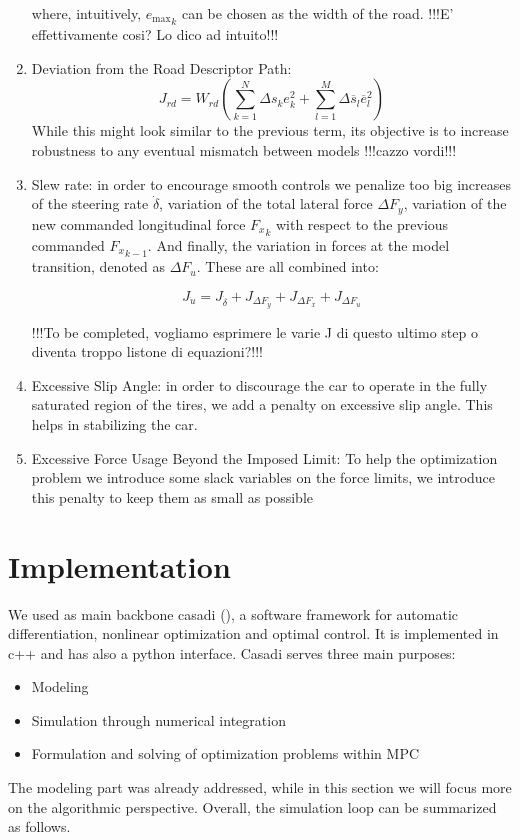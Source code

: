 \documentclass[a4paper, onecolumn, 12pt]{article}
\begin{document}
\begin{enumerate}
    where, intuitively, ${e_{\text{max}}}_k$ can be chosen as the width of the road. !!!E' effettivamente cosi? Lo dico ad intuito!!!

    \item Deviation from the Road Descriptor Path: 
    \begin{equation}
    J_{rd} = W_{rd}(\sum_{k=1}^{N} \Delta s_k e_k^2 + \sum_{l=1}^{M} \Delta\overline{s}_l \overline{e}_l^2)
    \end{equation}
    While this might look similar to the previous term, its objective is to increase robustness to any eventual mismatch between models !!!cazzo vordi!!!

    \item Slew rate: in order to encourage smooth controls we penalize too big increases of the steering rate $\dot{\delta}$, variation of the total lateral force $\Delta F_y$, variation of the new commanded longitudinal force ${F_x}_k$ with respect to the previous commanded ${F_x}_{k-1}$.
    And finally, the variation in forces at the model transition, denoted as $\Delta F_u$.
    These are all combined into:
    
    \begin{equation}
        J_{\dot{u}} = J_{\dot{\delta}} + J_{\Delta F_y} + J_{\Delta F_x} + J_{\Delta F_u}
    \end{equation}

    !!!To be completed, vogliamo esprimere le varie J di questo ultimo step o diventa troppo listone di equazioni?!!!
    
    \item Excessive Slip Angle: in order to discourage the car to operate in the fully saturated region of the tires, we add a penalty on excessive slip angle. This helps in stabilizing the car.

    \item Excessive Force Usage Beyond the Imposed Limit:
    To help the optimization problem we introduce some slack variables on the force limits, we introduce this penalty to keep them as small as possible
    
\end{enumerate}

\section{Implementation}

We used as main backbone casadi (\cite{casadi}), a software framework for automatic
differentiation, nonlinear optimization and optimal control. It is implemented
in c++ and has also a python interface. Casadi serves three main purposes:
\begin{itemize}
    \item Modeling
    \item Simulation through numerical integration
    \item Formulation and solving of optimization problems within MPC
\end{itemize}
The modeling part was already addressed, while in this section we will focus
more on the algorithmic perspective. Overall, the simulation loop can be
summarized as follows.
\end{document}
